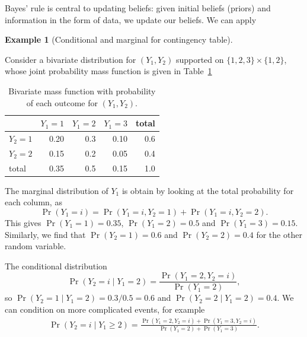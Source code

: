 \documentclass[
  11pt,
  letterpaper,
]{scrbook}
\theoremstyle{definition}
\theoremstyle{definition}
\newtheorem{example}{Example}[chapter]
\theoremstyle{definition}
\theoremstyle{plain}
\theoremstyle{plain}
\theoremstyle{remark}
\begin{document}
Bayes' rule is central to updating beliefs: given initial beliefs
(priors) and information in the form of data, we update our beliefs. We
can apply

\begin{example}[Conditional and marginal for contingency
table]\protect\hypertarget{exm-discrete-conditional-marginal}{}\label{exm-discrete-conditional-marginal}

Consider a bivariate distribution for \((Y_1, Y_2)\) supported on
\(\{1, 2, 3\} \times \{1, 2\}\), whose joint probability mass function
is given in Table~\ref{tbl-bivardiscrete}

\begin{longtable}[]{@{}lrrrr@{}}

\caption{\label{tbl-bivardiscrete}Bivariate mass function with
probability of each outcome for \((Y_1, Y_2)\).}

\tabularnewline

\toprule\noalign{}
& \(Y_1=1\) & \(Y_1=2\) & \(Y_1=3\) & total \\
\midrule\noalign{}
\endhead
\bottomrule\noalign{}
\endlastfoot
\(Y_2=1\) & 0.20 & 0.3 & 0.10 & 0.6 \\
\(Y_2=2\) & 0.15 & 0.2 & 0.05 & 0.4 \\
total & 0.35 & 0.5 & 0.15 & 1.0 \\

\end{longtable}

The marginal distribution of \(Y_1\) is obtain by looking at the total
probability for each column, as
\[\Pr(Y_1=i) = \Pr(Y_1=i, Y_2=1)+ \Pr(Y_1=i, Y_2=2).\] This gives
\(\Pr(Y_1=1)=0.35\), \(\Pr(Y_1=2)=0.5\) and \(\Pr(Y_1=3) = 0.15.\)
Similarly, we find that \(\Pr(Y_2=1)=0.6\) and \(\Pr(Y_2=2)=0.4\) for
the other random variable.

The conditional distribution
\[\Pr(Y_2 = i \mid Y_1=2) = \frac{\Pr(Y_1=2, Y_2=i)}{\Pr(Y_1=2)},\] so
\(\Pr(Y_2 = 1 \mid Y_1=2) = 0.3/0.5 = 0.6\) and
\(\Pr(Y_2=2 \mid Y_1=2) = 0.4.\) We can condition on more complicated
events, for example \begin{align*}
\Pr(Y_2 = i \mid Y_1 \ge 2) = \frac{\Pr(Y_1=2, Y_2=i) + \Pr(Y_1=3, Y_2=i)}{\Pr(Y_1=2) + \Pr(Y_1=3)}.
\end{align*}

\end{example}
\end{document}
